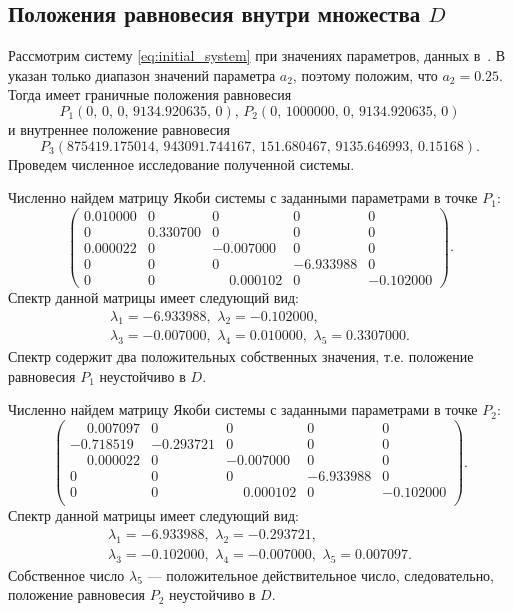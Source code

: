 \documentclass[14pt,a4paper]{extarticle}
\begin{document}
	\subsection{Положения равновесия внутри множества $D$}
	
	\begin{example}
		Рассмотрим систему \ref{eq:initial_system} при значениях параметров, данных в~\cite{model_params}. В \cite{model_params} указан только диапазон значений параметра $a_2$, поэтому положим, что $a_2=0.25$. Тогда имеет граничные положения равновесия
		\[P_1\left(0,\,0,\,0,\,9134.920635,\,0\right),\, P_2\left(0,\,1000000,\,0,\,9134.920635,\,0\right)\]
		и внутреннее положение равновесия
		\[P_3\left(875419.175014,\,943091.744167,\,151.680467,\,9135.646993,\,0.15168\right).\] 
		Проведем численное исследование полученной системы.
		
		Численно найдем матрицу Якоби системы с заданными параметрами в точке $P_1$: 
		\[\begin{pmatrix}
			0.010000& 0       & 0       & 0       & 0\\
			0       & 0.330700& 0       & 0       & 0\\
			0.000022& 0       &-0.007000& 0       & 0\\
			0       & 0       & 0       &-6.933988& 0\\
			0       & 0       &\phantom{-}0.000102& 0       &-0.102000
		\end{pmatrix}.\]
		Спектр данной матрицы имеет следующий вид:
		\begin{multline*}
			\lambda_1=-6.933988,\,\, \lambda_2=-0.102000,\\
			\lambda_3=-0.007000,\,\, \lambda_4=0.010000,\,\, \lambda_5=0.3307000.
		\end{multline*}
		Спектр содержит два положительных собственных значения, т.е. положение равновесия $P_1$ неустойчиво в $D$.
		
		Численно найдем матрицу Якоби системы с заданными параметрами  в точке $P_2$: 
		\[\begin{pmatrix}
			\phantom{-}0.007097& 0 &      0 &      0   &    0\\
			-0.718519&-0.293721& 0  &     0    &   0\\
			\phantom{-}0.000022& 0  &    -0.007000 &   0     &  0\\
			0     &  0   &     0    &    -6.933988&0\\
			0  &      0    &    \phantom{-}0.000102 & 0    &   -0.102000\\
		\end{pmatrix}.\]
		Спектр данной матрицы имеет следующий вид:
		\begin{multline*}
			\lambda_1=-6.933988,\,\, \lambda_2=-0.293721,\\
			\lambda_3=-0.102000,\,\, \lambda_4=-0.007000,\,\, \lambda_5=0.007097.
		\end{multline*}
		Собственное число $\lambda_5$ --- положительное действительное число, следовательно, положение равновесия $P_2$ неустойчиво в $D$.
		

\end{example}
\end{document}
